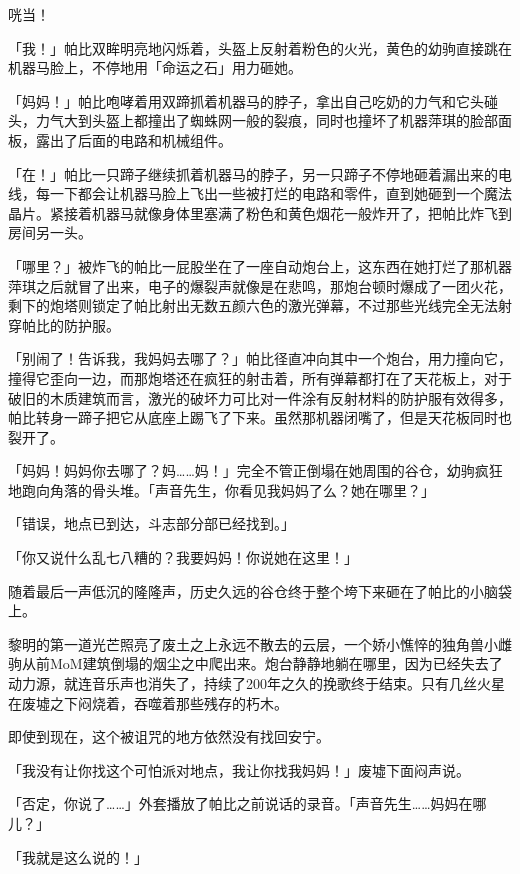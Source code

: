 咣当！

「我！」帕比双眸明亮地闪烁着，头盔上反射着粉色的火光，黄色的幼驹直接跳在机器马脸上，不停地用「命运之石」用力砸她。

「妈妈！」帕比咆哮着用双蹄抓着机器马的脖子，拿出自己吃奶的力气和它头碰头，力气大到头盔上都撞出了蜘蛛网一般的裂痕，同时也撞坏了机器萍琪的脸部面板，露出了后面的电路和机械组件。

「在！」帕比一只蹄子继续抓着机器马的脖子，另一只蹄子不停地砸着漏出来的电线，每一下都会让机器马脸上飞出一些被打烂的电路和零件，直到她砸到一个魔法晶片。紧接着机器马就像身体里塞满了粉色和黄色烟花一般炸开了，把帕比炸飞到房间另一头。

「哪里？」被炸飞的帕比一屁股坐在了一座自动炮台上，这东西在她打烂了那机器萍琪之后就冒了出来，电子的爆裂声就像是在悲鸣，那炮台顿时爆成了一团火花，剩下的炮塔则锁定了帕比射出无数五颜六色的激光弹幕，不过那些光线完全无法射穿帕比的防护服。

「别闹了！告诉我，我妈妈去哪了？」帕比径直冲向其中一个炮台，用力撞向它，撞得它歪向一边，而那炮塔还在疯狂的射击着，所有弹幕都打在了天花板上，对于破旧的木质建筑而言，激光的破坏力可比对一件涂有反射材料的防护服有效得多，帕比转身一蹄子把它从底座上踢飞了下来。虽然那机器闭嘴了，但是天花板同时也裂开了。

「妈妈！妈妈你去哪了？妈……妈！」完全不管正倒塌在她周围的谷仓，幼驹疯狂地跑向角落的骨头堆。「声音先生，你看见我妈妈了么？她在哪里？」

「{\mt 错误，地点已到达，斗志部分部已经找到。}」

「你又说什么乱七八糟的？我要妈妈！你说她在这里！」

随着最后一声低沉的隆隆声，历史久远的谷仓终于整个垮下来砸在了帕比的小脑袋上。

黎明的第一道光芒照亮了废土之上永远不散去的云层，一个娇小憔悴的独角兽小雌驹从前MoM建筑倒塌的烟尘之中爬出来。炮台静静地躺在哪里，因为已经失去了动力源，就连音乐声也消失了，持续了200年之久的挽歌终于结束。只有几丝火星在废墟之下闷烧着，吞噬着那些残存的朽木。

\horizonline


即使到现在，这个被诅咒的地方依然没有找回安宁。

「我没有让你找这个可怕派对地点，我让你找我妈妈！」废墟下面闷声说。

「{\mt 否定，你说了……}」外套播放了帕比之前说话的录音。「声音先生……妈妈在哪儿？」

「我就是这么说的！」

